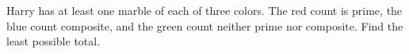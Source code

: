 Harry has at least one marble of each of three colors. The red count is prime, the blue count composite, and the green count neither prime nor composite. Find the least possible total.
